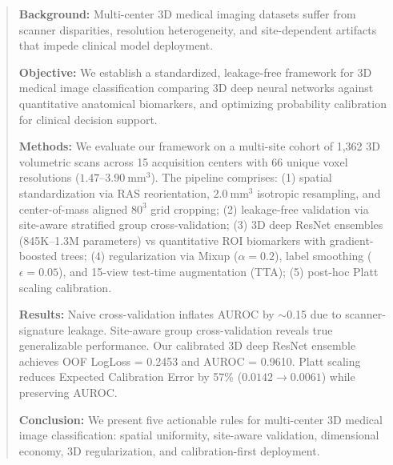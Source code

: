 \begin{abstract}
\noindent\textbf{Background:} Multi-center 3D medical imaging datasets suffer from scanner disparities, resolution heterogeneity, and site-dependent artifacts that impede clinical model deployment. 

\noindent\textbf{Objective:} We establish a standardized, leakage-free framework for 3D medical image classification comparing 3D deep neural networks against quantitative anatomical biomarkers, and optimizing probability calibration for clinical decision support.

\noindent\textbf{Methods:} We evaluate our framework on a multi-site cohort of 1,362 3D volumetric scans across 15 acquisition centers with 66 unique voxel resolutions ($1.47\text{--}3.90~\text{mm}^3$). The pipeline comprises: (1) spatial standardization via RAS reorientation, $2.0~\text{mm}^3$ isotropic resampling, and center-of-mass aligned $80^3$ grid cropping; (2) leakage-free validation via site-aware stratified group cross-validation; (3) 3D deep ResNet ensembles (845K--1.3M parameters) vs quantitative ROI biomarkers with gradient-boosted trees; (4) regularization via Mixup ($\alpha=0.2$), label smoothing ($\epsilon=0.05$), and 15-view test-time augmentation (TTA); (5) post-hoc Platt scaling calibration.

\noindent\textbf{Results:} Naive cross-validation inflates AUROC by $\sim$0.15 due to scanner-signature leakage. Site-aware group cross-validation reveals true generalizable performance. Our calibrated 3D deep ResNet ensemble achieves OOF LogLoss = 0.2453 and AUROC = 0.9610. Platt scaling reduces Expected Calibration Error by 57\% ($0.0142 \to 0.0061$) while preserving AUROC.

\noindent\textbf{Conclusion:} We present five actionable rules for multi-center 3D medical image classification: spatial uniformity, site-aware validation, dimensional economy, 3D regularization, and calibration-first deployment.
\end{abstract}